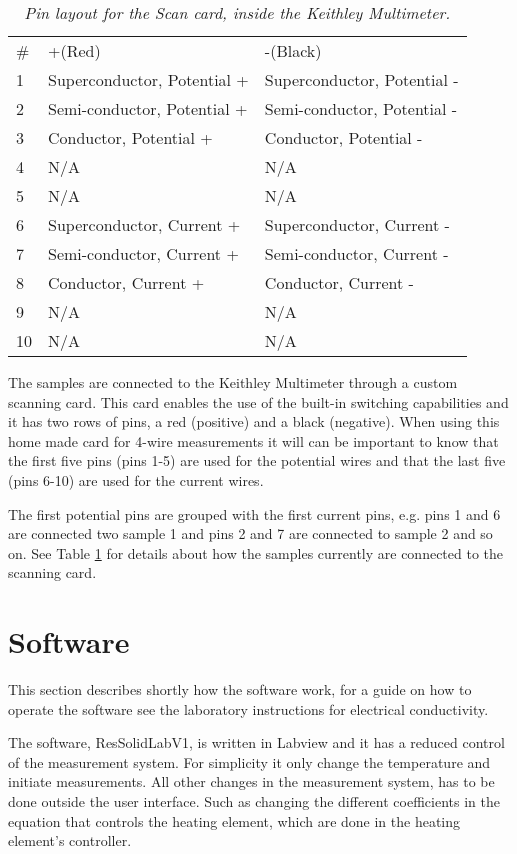 \documentclass[a4paper,12pt]{article}
\begin{document}
\begin{table}
	\center
	\label{tab:ScanCard}
	\caption{\emph{Pin layout for the Scan card, inside the Keithley Multimeter.}} 
	\begin{tabular}{l|l|l}
		\#  & +(Red) & -(Black) \\
		1  & Superconductor, Potential +	& Superconductor, Potential - \\
		2  & Semi-conductor, Potential +		& Semi-conductor, Potential - \\
		3  & Conductor, Potential +			& Conductor, Potential - \\
		4  & 	N/A	& N/A \\
		5  & 	N/A	& N/A \\
		6  & Superconductor, Current +		& Superconductor, Current - \\
		7  & Semi-conductor, Current +		& Semi-conductor, Current - \\
		8  & Conductor, Current +			& Conductor, Current - \\
		9  & 	N/A	& N/A \\
		10 & 	N/A	& N/A \\
	\end{tabular}
\end{table}

The samples are connected to the Keithley Multimeter through a custom scanning card. This card enables the use of the built-in switching capabilities and it has two rows of pins, a red (positive) and a black (negative). When using this home made card for 4-wire measurements it will can be important to know that the first five pins (pins 1-5) are used for the potential wires and that the  last five (pins 6-10) are used for the current wires.

The first potential pins are grouped with the first current pins, e.g. pins 1 and 6 are connected two sample 1 and pins 2 and 7 are connected to sample 2 and so on. See Table \ref{tab:ScanCard} for details about how the samples currently are connected to the scanning card.
 

\section{Software}

This section describes shortly how the software work, for a guide on how to operate the software see the laboratory instructions for electrical conductivity. 

The software, ResSolidLabV1, is written in Labview and it   has a reduced control of the measurement system. For simplicity it only change the temperature and initiate measurements. All other changes in the measurement system, has to be done outside the user interface. Such as changing the different coefficients in the equation that controls the heating element, which are done in the heating element's controller. 
\end{document}
